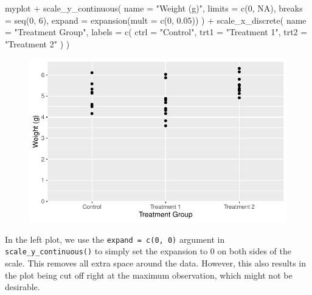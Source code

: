 \documentclass[
  letterpaper,
  DIV=11,
  numbers=noendperiod]{scrartcl}
\newenvironment{Shaded}{\begin{snugshade}}{\end{snugshade}}
\newcommand{\AttributeTok}[1]{\textcolor[rgb]{0.40,0.45,0.13}{#1}}
\newcommand{\ConstantTok}[1]{\textcolor[rgb]{0.56,0.35,0.01}{#1}}
\newcommand{\DecValTok}[1]{\textcolor[rgb]{0.68,0.00,0.00}{#1}}
\newcommand{\FloatTok}[1]{\textcolor[rgb]{0.68,0.00,0.00}{#1}}
\newcommand{\FunctionTok}[1]{\textcolor[rgb]{0.28,0.35,0.67}{#1}}
\newcommand{\NormalTok}[1]{\textcolor[rgb]{0.00,0.23,0.31}{#1}}
\newcommand{\SpecialCharTok}[1]{\textcolor[rgb]{0.37,0.37,0.37}{#1}}
\newcommand{\StringTok}[1]{\textcolor[rgb]{0.13,0.47,0.30}{#1}}
\begin{document}
\begin{Shaded}
\begin{Highlighting}[]
\NormalTok{myplot }\SpecialCharTok{+}
  \FunctionTok{scale\_y\_continuous}\NormalTok{(}
    \AttributeTok{name =} \StringTok{"Weight (g)"}\NormalTok{,}
    \AttributeTok{limits =} \FunctionTok{c}\NormalTok{(}\DecValTok{0}\NormalTok{, }\ConstantTok{NA}\NormalTok{),}
    \AttributeTok{breaks =} \FunctionTok{seq}\NormalTok{(}\DecValTok{0}\NormalTok{, }\DecValTok{6}\NormalTok{),}
    \AttributeTok{expand =} \FunctionTok{expansion}\NormalTok{(}\AttributeTok{mult =} \FunctionTok{c}\NormalTok{(}\DecValTok{0}\NormalTok{, }\FloatTok{0.05}\NormalTok{))}
\NormalTok{  ) }\SpecialCharTok{+}
  \FunctionTok{scale\_x\_discrete}\NormalTok{(}
    \AttributeTok{name =} \StringTok{"Treatment Group"}\NormalTok{,}
    \AttributeTok{labels =} \FunctionTok{c}\NormalTok{(}
      \AttributeTok{ctrl =} \StringTok{"Control"}\NormalTok{, }
      \AttributeTok{trt1 =} \StringTok{"Treatment 1"}\NormalTok{, }
      \AttributeTok{trt2 =} \StringTok{"Treatment 2"}
\NormalTok{    )}
\NormalTok{  )}
\end{Highlighting}
\end{Shaded}

\begin{figure}[H]

{\centering \includegraphics{ggplot2intro_files/figure-pdf/unnamed-chunk-15-1.pdf}

}

\end{figure}

In the left plot, we use the \texttt{expand\ =\ c(0,\ 0)} argument in
\texttt{scale\_y\_continuous()} to simply set the expansion to 0 on both
sides of the scale. This removes all extra space around the data.
However, this also results in the plot being cut off right at the
maximum observation, which might not be desirable.
\end{document}
